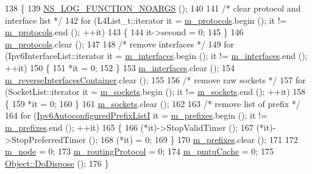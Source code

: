 \begin{DoxyCode}
138 \{
139   \hyperlink{log-macros-disabled_8h_a8f7e4afc291c9d29a65c18ac1f79197b}{NS\_LOG\_FUNCTION\_NOARGS} ();
140 
141   \textcolor{comment}{/* clear protocol and interface list */}
142   \textcolor{keywordflow}{for} (L4List\_t::iterator it = \hyperlink{classns3_1_1Ipv6L3Protocol_a5a68c54b92d81f93c41983ebdc0ef5b3}{m\_protocols}.begin (); it != 
      \hyperlink{classns3_1_1Ipv6L3Protocol_a5a68c54b92d81f93c41983ebdc0ef5b3}{m\_protocols}.end (); ++it)
143     \{
144       it->second = 0;
145     \}
146   \hyperlink{classns3_1_1Ipv6L3Protocol_a5a68c54b92d81f93c41983ebdc0ef5b3}{m\_protocols}.clear ();
147 
148   \textcolor{comment}{/* remove interfaces */}
149   \textcolor{keywordflow}{for} (Ipv6InterfaceList::iterator it = \hyperlink{classns3_1_1Ipv6L3Protocol_a425d8738fd30fbc9345d57cfddd0d6d0}{m\_interfaces}.begin (); it != 
      \hyperlink{classns3_1_1Ipv6L3Protocol_a425d8738fd30fbc9345d57cfddd0d6d0}{m\_interfaces}.end (); ++it)
150     \{
151       *it = 0;
152     \}
153   \hyperlink{classns3_1_1Ipv6L3Protocol_a425d8738fd30fbc9345d57cfddd0d6d0}{m\_interfaces}.clear ();
154   \hyperlink{classns3_1_1Ipv6L3Protocol_aba2395fbe747b5c8d0f46d65556eea0c}{m\_reverseInterfacesContainer}.clear ();
155 
156   \textcolor{comment}{/* remove raw sockets */}
157   \textcolor{keywordflow}{for} (SocketList::iterator it = \hyperlink{classns3_1_1Ipv6L3Protocol_a515e9cba13d7fd95e5613f5c95ccc7b5}{m\_sockets}.begin (); it != \hyperlink{classns3_1_1Ipv6L3Protocol_a515e9cba13d7fd95e5613f5c95ccc7b5}{m\_sockets}.end (); ++it)
158     \{
159       *it = 0;
160     \}
161   \hyperlink{classns3_1_1Ipv6L3Protocol_a515e9cba13d7fd95e5613f5c95ccc7b5}{m\_sockets}.clear ();
162 
163   \textcolor{comment}{/* remove list of prefix */}
164   \textcolor{keywordflow}{for} (\hyperlink{classns3_1_1Ipv6L3Protocol_af00957df9fbda1b1427ad41dd788b99a}{Ipv6AutoconfiguredPrefixListI} it = 
      \hyperlink{classns3_1_1Ipv6L3Protocol_a402d76e60e8ac25eeb200d2b288732c0}{m\_prefixes}.begin (); it != \hyperlink{classns3_1_1Ipv6L3Protocol_a402d76e60e8ac25eeb200d2b288732c0}{m\_prefixes}.end (); ++it)
165     \{
166       (*it)->StopValidTimer ();
167       (*it)->StopPreferredTimer ();
168       (*it) = 0;
169     \}
170   \hyperlink{classns3_1_1Ipv6L3Protocol_a402d76e60e8ac25eeb200d2b288732c0}{m\_prefixes}.clear ();
171 
172   \hyperlink{classns3_1_1Ipv6L3Protocol_a543d8509395ee76de15d039ff1fce642}{m\_node} = 0;
173   \hyperlink{classns3_1_1Ipv6L3Protocol_aa0df547e5240b218dc1f4742a2a00117}{m\_routingProtocol} = 0;
174   \hyperlink{classns3_1_1Ipv6L3Protocol_a03a839bfaf9ae8763a58a42e60b08ec5}{m\_pmtuCache} = 0;
175   \hyperlink{classns3_1_1Object_a475d429a75d302d4775f4ae32479b287}{Object::DoDispose} ();
176 \}
\end{DoxyCode}



